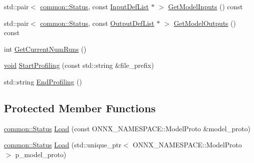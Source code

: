 \begin{DoxyCompactItemize}
\item 
std\+::pair$<$ \mbox{\hyperlink{classonnxruntime_1_1common_1_1Status}{common\+::\+Status}}, const \mbox{\hyperlink{namespaceonnxruntime_ab363b0109a9af018fb3e355aac00a360}{Input\+Def\+List}} $\ast$ $>$ \mbox{\hyperlink{classonnxruntime_1_1InferenceSession_ae8519d7cd45b56ba6bf83c13757cd55e}{Get\+Model\+Inputs}} () const
\item 
std\+::pair$<$ \mbox{\hyperlink{classonnxruntime_1_1common_1_1Status}{common\+::\+Status}}, const \mbox{\hyperlink{namespaceonnxruntime_a4b3c292f33b95d038b5059f6103f287a}{Output\+Def\+List}} $\ast$ $>$ \mbox{\hyperlink{classonnxruntime_1_1InferenceSession_a7a705fa4164dc161e76a7641820fe65a}{Get\+Model\+Outputs}} () const
\item 
int \mbox{\hyperlink{classonnxruntime_1_1InferenceSession_a9dbfd5df60f36c82833248db96dbe8fc}{Get\+Current\+Num\+Runs}} ()
\item 
\mbox{\hyperlink{mlasi_8h_a88f941d423cb2a819b70a1358982b1a6}{void}} \mbox{\hyperlink{classonnxruntime_1_1InferenceSession_ab29bd2f63b9f4d5840e846f8bf705e8a}{Start\+Profiling}} (const std\+::string \&file\+\_\+prefix)
\item 
std\+::string \mbox{\hyperlink{classonnxruntime_1_1InferenceSession_ac9e69b0d77c3afb6c0fcad0969cfca17}{End\+Profiling}} ()
\end{DoxyCompactItemize}
\subsection*{Protected Member Functions}
\begin{DoxyCompactItemize}
\item 
\mbox{\hyperlink{classonnxruntime_1_1common_1_1Status}{common\+::\+Status}} \mbox{\hyperlink{classonnxruntime_1_1InferenceSession_aa5f2da68be50bff8a01e9801c28c77b2}{Load}} (const O\+N\+N\+X\+\_\+\+N\+A\+M\+E\+S\+P\+A\+C\+E\+::\+Model\+Proto \&model\+\_\+proto)
\item 
\mbox{\hyperlink{classonnxruntime_1_1common_1_1Status}{common\+::\+Status}} \mbox{\hyperlink{classonnxruntime_1_1InferenceSession_aa26b302ae1387cbd87025470a8ebb449}{Load}} (std\+::unique\+\_\+ptr$<$ O\+N\+N\+X\+\_\+\+N\+A\+M\+E\+S\+P\+A\+C\+E\+::\+Model\+Proto $>$ p\+\_\+model\+\_\+proto)
\end{DoxyCompactItemize}


